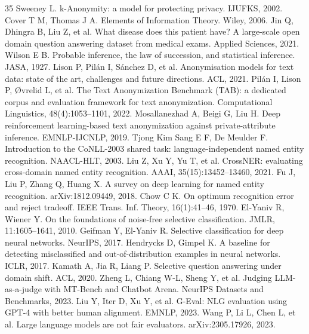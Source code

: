 \documentclass[11pt,a4paper]{article}
\begin{document}
\begin{thebibliography}{35}
 Sweeney L. k-Anonymity: a model for protecting privacy. IJUFKS, 2002.
 Cover T M, Thomas J A. Elements of Information Theory. Wiley, 2006.
 Jin Q, Dhingra B, Liu Z, et al. What disease does this patient have? A large-scale open domain question answering dataset from medical exams. Applied Sciences, 2021.
 Wilson E B. Probable inference, the law of succession, and statistical inference. JASA, 1927.
 Lison P, Pil\'an I, S\'anchez D, et al. Anonymisation models for text data: state of the art, challenges and future directions. ACL, 2021.
 Pil\'an I, Lison P, {\O}vrelid L, et al. The Text Anonymization Benchmark (TAB): a dedicated corpus and evaluation framework for text anonymization. Computational Linguistics, 48(4):1053--1101, 2022.
 Mosallanezhad A, Beigi G, Liu H. Deep reinforcement learning-based text anonymization against private-attribute inference. EMNLP-IJCNLP, 2019.
 Tjong Kim Sang E F, De Meulder F. Introduction to the CoNLL-2003 shared task: language-independent named entity recognition. NAACL-HLT, 2003.
 Liu Z, Xu Y, Yu T, et al. CrossNER: evaluating cross-domain named entity recognition. AAAI, 35(15):13452--13460, 2021.
 Fu J, Liu P, Zhang Q, Huang X. A survey on deep learning for named entity recognition. arXiv:1812.09449, 2018.
 Chow C K. On optimum recognition error and reject tradeoff. IEEE Trans. Inf. Theory, 16(1):41--46, 1970.
 El-Yaniv R, Wiener Y. On the foundations of noise-free selective classification. JMLR, 11:1605--1641, 2010.
 Geifman Y, El-Yaniv R. Selective classification for deep neural networks. NeurIPS, 2017.
 Hendrycks D, Gimpel K. A baseline for detecting misclassified and out-of-distribution examples in neural networks. ICLR, 2017.
 Kamath A, Jia R, Liang P. Selective question answering under domain shift. ACL, 2020.
 Zheng L, Chiang W-L, Sheng Y, et al. Judging LLM-as-a-judge with MT-Bench and Chatbot Arena. NeurIPS Datasets and Benchmarks, 2023.
 Liu Y, Iter D, Xu Y, et al. G-Eval: NLG evaluation using GPT-4 with better human alignment. EMNLP, 2023.
 Wang P, Li L, Chen L, et al. Large language models are not fair evaluators. arXiv:2305.17926, 2023.
\end{thebibliography}
\end{document}
